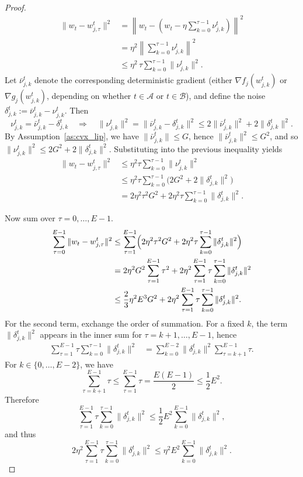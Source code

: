 \documentclass{article} %
\begin{document}
\begin{proof}
\begin{align*}
    \|w_t - w_{j,\tau}^t\|^2
    &= \left\|w_t -\left(w_t - \eta \sum_{k=0}^{\tau-1}\nu_{j,k}^t\right)\right\|^2
    \\
    &= \eta^2\left\|\sum_{k=0}^{\tau-1}\nu_{j,k}^t\right\|^2
    \\
    &\leq \eta^2 \,\tau \sum_{k=0}^{\tau-1}\|\nu_{j,k}^t\|^2.
\end{align*}
Let $\bar{\nu}_{j,k}^t$ denote the corresponding {deterministic} gradient
(either $\nabla f_j(w_{j,k}^t)$ or $\nabla g_j(w_{j,k}^t)$, depending on whether $t \in \mathcal{A}$ or $t \in \mathcal{B}$), and define the noise
$
\delta_{j,k}^t := \bar{\nu}_{j,k}^t - \nu_{j,k}^t.
$
Then
\[
\nu_{j,k}^t = \bar{\nu}_{j,k}^t - \delta_{j,k}^t
\quad\Rightarrow\quad
\|\nu_{j,k}^t\|^2
= \|\bar{\nu}_{j,k}^t - \delta_{j,k}^t\|^2
\le 2\|\bar{\nu}_{j,k}^t\|^2 + 2\|\delta_{j,k}^t\|^2.
\]
By Assumption~\ref{as:cvx_lip}, we have
$\|\bar{\nu}_{j,k}^t\|\le G$, hence $\|\bar{\nu}_{j,k}^t\|^2 \le G^2$, and so
$
\|\nu_{j,k}^t\|^2 \le 2G^2 + 2\|\delta_{j,k}^t\|^2.
$
Substituting into the previous inequality yields
\begin{align*}
    \|w_t - w_{j,\tau}^t\|^2
    &\le \eta^2 \tau \sum_{k=0}^{\tau-1}\|\nu_{j,k}^t\|^2
    \\
    &\le \eta^2 \tau \sum_{k=0}^{\tau-1}
        \bigl(2G^2 + 2\|\delta_{j,k}^t\|^2\bigr)
    \\
    &= 2\eta^2 \tau^2 G^2
       + 2 \eta^2 \tau\sum_{k=0}^{\tau-1}\|\delta_{j,k}^t\|^2.
\end{align*}

Now sum over $\tau=0,\dots,E-1$.
\begin{align*}
    \sum_{\tau=0}^{E-1} \|w_t - w_{j,\tau}^t\|^2
    &\le
    \sum_{\tau=1}^{E-1}\Bigl(2\eta^2 \tau^2 G^2
       + 2 \eta^2 \tau\sum_{k=0}^{\tau-1}\|\delta_{j,k}^t\|^2\Bigr)
    \\
    &= 2\eta^2 G^2 \sum_{\tau=1}^{E-1} \tau^2
       + 2\eta^2 \sum_{\tau=1}^{E-1} \tau \sum_{k=0}^{\tau-1}\|\delta_{j,k}^t\|^2
    \\
    & \leq \frac{2}{3}\eta^2 E^3 G^2 + 2\eta^2 \sum_{\tau=1}^{E-1} \tau \sum_{k=0}^{\tau-1}\|\delta_{j,k}^t\|^2.
\end{align*}
For the second term, exchange the order of summation. For a fixed $k$, the term
$\|\delta_{j,k}^t\|^2$ appears in the inner sum for $\tau = k+1,\dots,E-1$, hence
\begin{align*}
    \sum_{\tau=1}^{E-1} \tau \sum_{k=0}^{\tau-1}\|\delta_{j,k}^t\|^2
    &= \sum_{k=0}^{E-2} \|\delta_{j,k}^t\|^2 \sum_{\tau=k+1}^{E-1} \tau.
\end{align*}
For $k \in \{0,\dots,E-2\}$, we have
\[
\sum_{\tau=k+1}^{E-1} \tau
\le \sum_{\tau=1}^{E-1} \tau
= \frac{E(E-1)}{2}
\le \frac{1}{2} E^2.
\]
Therefore
\[
\sum_{\tau=1}^{E-1} \tau \sum_{k=0}^{\tau-1}\|\delta_{j,k}^t\|^2
\le \frac{1}{2} E^2 \sum_{k=0}^{E-1}\|\delta_{j,k}^t\|^2,
\]
and thus
\[
2\eta^2 \sum_{\tau=1}^{E-1} \tau \sum_{k=0}^{\tau-1}\|\delta_{j,k}^t\|^2
\le \eta^2 E^2 \sum_{k=0}^{E-1}\|\delta_{j,k}^t\|^2.
\]


\end{proof}
\end{document}
